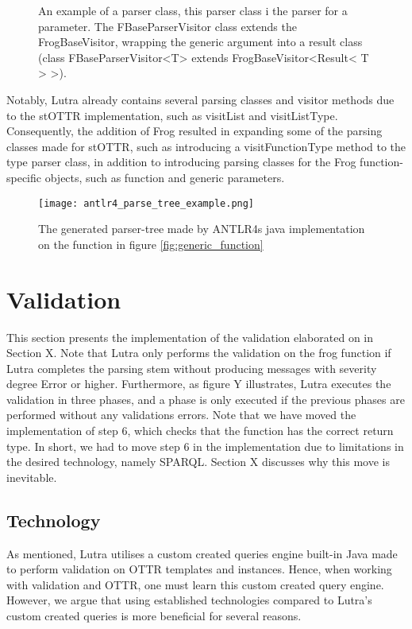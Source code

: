 \begin{figure}
  \begin{code}
      \label{parameterParser}
      An example of a parser class, this parser class i the parser for a parameter. The FBaseParserVisitor class extends the FrogBaseVisitor, wrapping the generic argument into a result class (class FBaseParserVisitor<T> extends FrogBaseVisitor<Result< T > >).  
  \end{code}
  
\end{figure}

\para
Notably, Lutra already contains several parsing classes and visitor methods due to the stOTTR implementation, such as visitList and visitListType. Consequently, the addition of Frog resulted in expanding some of the parsing classes made for stOTTR, such as introducing a visitFunctionType method to the type parser class, in addition to introducing parsing classes for the Frog function-specific objects, such as function and generic parameters. 


\begin{figure}
  \centering
  \texttt{[image: antlr4\_parse\_tree\_example.png]}
  \caption{The generated parser-tree made by ANTLR4s java implementation on the function in figure \ref{fig:generic_function}}
  \label{fig:parse_tree_example}
\end{figure}

\section{Validation}
\label{implValidation}
This section presents the implementation of the validation elaborated on in Section X. Note that Lutra only performs the validation on the frog function if Lutra completes the parsing stem without producing messages with severity degree Error or higher. Furthermore, as figure Y illustrates, Lutra executes the validation in three phases, and a phase is only executed if the previous phases are performed without any validations errors. Note that we have moved the implementation of step 6, which checks that the function has the correct return type. In short, we had to move step 6 in the implementation due to limitations in the desired technology, namely SPARQL. Section X discusses why this move is inevitable.

\subsection{Technology}
As mentioned, Lutra utilises a custom created queries engine built-in Java made to perform validation on OTTR templates and instances. Hence, when working with validation and OTTR, one must learn this custom created query engine. However, we argue that using established technologies compared to Lutra's custom created queries is more beneficial for several reasons. 

